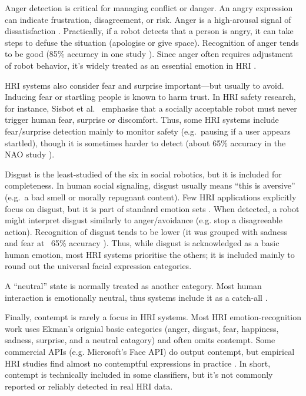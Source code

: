 Anger detection is critical for managing conflict or danger. An angry expression can indicate frustration, disagreement, or risk. Anger is a high-arousal signal of dissatisfaction \cite{Stock-Homburg2022-wd}. Practically, if a robot detects that a person is angry, it can take steps to defuse the situation (apologise or give space). Recognition of anger tends to be good (85\% accuracy in one study \cite{Ramis2020-ec}). Since anger often requires adjustment of robot behavior, it's widely treated as an essential emotion in HRI \cite{Stock-Homburg2022-wd}.

HRI systems also consider fear and surprise important—but usually to avoid. Inducing fear or startling people is known to harm trust. In HRI safety research, for instance, Sisbot et al.\ \cite{Sisbot2010-wy} emphasise that a socially acceptable robot must never trigger human fear, surprise or discomfort. Thus, some HRI systems include fear/surprise detection mainly to monitor safety (e.g.\ pausing if a user appears startled), though it is sometimes harder to detect (about 65\% accuracy in the NAO study \cite{Filippini2021-ni}).

Disgust is the least-studied of the six in social robotics, but it is included for completeness. In human social signaling, disgust usually means ``this is aversive'' (e.g.\ a bad smell or morally repugnant content). Few HRI applications explicitly focus on disgust, but it is part of standard emotion sets \cite{Stock-Homburg2022-wd}. When detected, a robot might interpret disgust similarly to anger/avoidance (e.g. stop a disagreeable action). Recognition of disgust tends to be lower (it was grouped with sadness and fear at ~65\% accuracy \cite{Filippini2021-ni}). Thus, while disgust is acknowledged as a basic human emotion, most HRI systems prioritise the others; it is included mainly to round out the universal facial expression categories.

A ``neutral'' state is normally treated as another category. Most human interaction is emotionally neutral, thus systems include it as a catch-all \cite{Alonso-Martin2013-cv}.

Finally, contempt is rarely a focus in HRI systems. Most HRI emotion-recognition work uses Ekman's orignial basic categories (anger, disgust, fear, happiness, sadness, surprise, and a neutral catagory) and often omits contempt. Some commercial APIs (e.g. Microsoft's Face API) do output contempt, but empirical HRI studies find almost no contemptful expressions in practice \cite{Chuah2021-zw}. In short, contempt is technically included in some classifiers, but it's not commonly reported or reliably detected in real HRI data.


